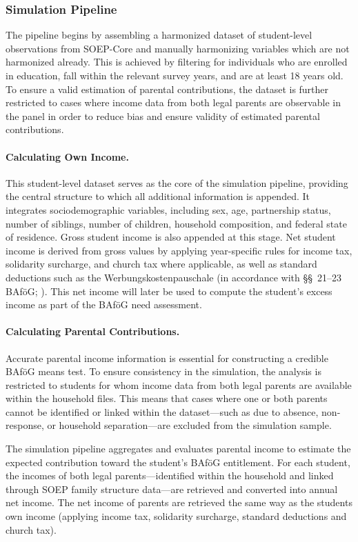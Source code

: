 \subsubsection{Simulation Pipeline}
The pipeline begins by assembling a harmonized dataset of student-level observations from SOEP-Core and manually harmonizing variables which are not harmonized already.
This is achieved by filtering for individuals who are enrolled in education, fall within the relevant survey years, and are at least 18 years old. 
To ensure a valid estimation of parental contributions, the dataset is further restricted to cases where income data from both legal parents are observable in the panel in order to reduce bias and ensure validity of estimated parental contributions.

\paragraph{Calculating Own Income.} 
This student-level dataset serves as the core of the simulation pipeline, providing the central structure to which all additional information is appended. 
It integrates sociodemographic variables, including sex, age, partnership status, number of siblings, number of children, household composition, and federal state of residence. 
Gross student income is also appended at this stage. 
Net student income is derived from gross values by applying year-specific rules for income tax, solidarity surcharge, and church tax where applicable, as well as standard deductions such as the Werbungskostenpauschale (in accordance with §§~21–23 BAföG; \citep{bafoeg_law}). 
This net income will later be used to compute the student’s excess income as part of the BAföG need assessment.

\paragraph{Calculating Parental Contributions.}
Accurate parental income information is essential for constructing a credible BAföG means test. 
To ensure consistency in the simulation, the analysis is restricted to students for whom income data from both legal parents are available within the household files. 
This means that cases where one or both parents cannot be identified or linked within the dataset—such as due to absence, non-response, or household separation—are excluded from the simulation sample.

The simulation pipeline aggregates and evaluates parental income to estimate the expected contribution toward the student’s BAföG entitlement. 
For each student, the incomes of both legal parents—identified within the household and linked through SOEP family structure data—are retrieved and converted into annual net income. 
The net income of parents are retrieved the same way as the students own income (applying income tax, solidarity surcharge, standard deductions and church tax).

